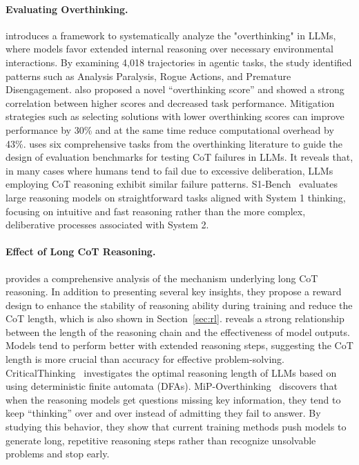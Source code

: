 \paragraph{\textbf{Evaluating Overthinking.}} \cite{cuadron2025dangeroverthinkingexaminingreasoningaction} introduces a framework to systematically analyze the "overthinking" in LLMs, where models favor extended internal reasoning over necessary environmental interactions. By examining 4,018 trajectories in agentic tasks, the study identified patterns such as Analysis Paralysis, Rogue Actions, and Premature Disengagement. \cite{cuadron2025dangeroverthinkingexaminingreasoningaction} also proposed a novel ``overthinking score'' and showed a strong correlation between higher scores and decreased task performance. Mitigation strategies such as selecting solutions with lower overthinking scores can improve performance by 30\% and at the same time reduce computational overhead by 43\%. \cite{liu2024mind} uses six comprehensive tasks from the overthinking literature to guide the design of evaluation benchmarks for testing CoT failures in LLMs. It reveals that, in many cases where humans tend to fail due to excessive deliberation, LLMs employing CoT reasoning exhibit similar failure patterns. S1-Bench~\cite{zhang2025s1} evaluates large reasoning models on straightforward tasks aligned with System 1 thinking, focusing on intuitive and fast reasoning rather than the more complex, deliberative processes associated with System 2.


\paragraph{\textbf{Effect of Long CoT Reasoning.}} \cite{yeo2025demystifying} provides a comprehensive analysis of the mechanism underlying long CoT reasoning. In addition to presenting several key insights, they propose a reward design to enhance the stability of reasoning ability during training and reduce the CoT length, which is also shown in Section~\ref{sec:rl}. \cite{jin2024impact} reveals a strong relationship between the length of the reasoning chain and the effectiveness of model outputs. Models tend to perform better with extended reasoning steps, suggesting the CoT length is more crucial than accuracy for effective problem-solving. CriticalThinking~\cite{lee2025criticalthinkingkindscomplexity} investigates the optimal reasoning length of LLMs based on using deterministic finite automata (DFAs). MiP-Overthinking~\cite{fan2025missing} discovers that when the reasoning models get questions missing key information, they tend to keep ``thinking'' over and over instead of admitting they fail to answer. By studying this behavior, they show that current training methods push models to generate long, repetitive reasoning steps rather than recognize unsolvable problems and stop early.

